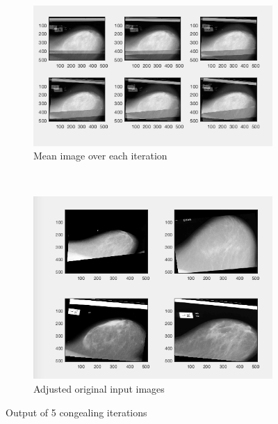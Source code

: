 \documentclass[11pt,fleqn,twoside]{article}
\begin{document}
\begin{figure}[!ht]
    \centering
    \begin{subfigure}[b]{0.4\textwidth}
        \includegraphics[width=\textwidth]{img/iteration-mean.png}
        \caption{Mean image over each iteration}
        \label{fig:mean-imgs}
    \end{subfigure}
    ~ %
    \begin{subfigure}[b]{0.4\textwidth}
        \includegraphics[width=\textwidth]{img/adj-ser.png}
        \caption{Adjusted original input images}
        \label{fig:adj-ser}
    \end{subfigure}
    \caption{Output of 5 congealing iterations}\label{fig:mammo-results}
\end{figure}
\end{document}
